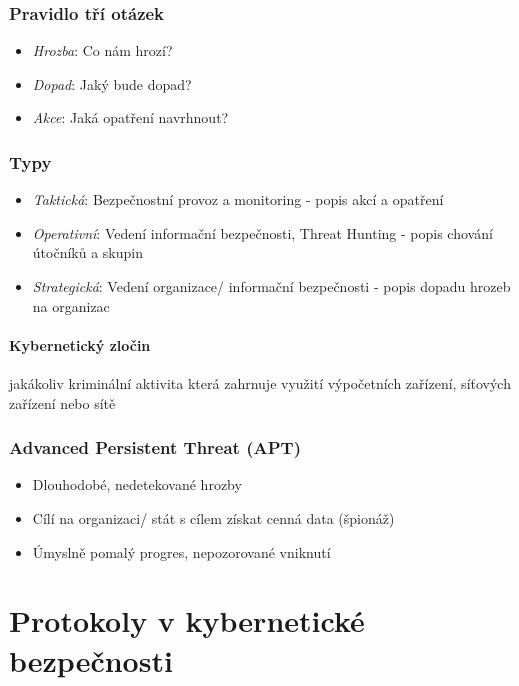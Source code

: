 \documentclass[10pt,a4paper]{article}
\begin{document}
\subsubsection*{Pravidlo tří otázek}
\begin{itemize}
    \item \textit{Hrozba}: Co nám hrozí? 
    \item \textit{Dopad}: Jaký bude dopad?
    \item \textit{Akce}: Jaká opatření navrhnout?
\end{itemize}

\subsubsection*{Typy}
\begin{itemize}
    \item \textit{Taktická}: Bezpečnostní provoz a monitoring - popis akcí a opatření
    \item \textit{Operativní}: Vedení informační bezpečnosti, Threat Hunting - popis chování útočníků a skupin
    \item \textit{Strategická}: Vedení organizace/ informační bezpečnosti - popis dopadu hrozeb na organizac
\end{itemize}

\paragraph*{Kybernetický zločin} jakákoliv kriminální aktivita která zahrnuje využití výpočetních zařízení, síťových zařízení nebo sítě

\subsubsection*{Advanced Persistent Threat (APT)}
\begin{itemize}
    \item Dlouhodobé, nedetekované hrozby
    \item Cílí na organizaci/ stát s cílem získat cenná data (špionáž)
    \item Úmyslně pomalý progres, nepozorované vniknutí
\end{itemize}



\section{Protokoly v kybernetické bezpečnosti}
\end{document}
